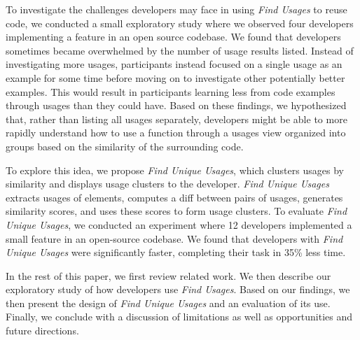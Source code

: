 \documentclass[conference]{IEEEtran}
\begin{document}


To investigate the challenges developers may face in using \textit{Find Usages} to reuse code, we conducted a small exploratory study where we observed four developers implementing a feature in an open source codebase. We found that developers sometimes became overwhelmed by the number of usage results listed. Instead of investigating more usages, participants instead focused on a single usage as an example for some time before moving on to investigate other potentially better examples. This would result in participants learning less from code examples through usages than they could have.
Based on these findings, we hypothesized that, rather than listing all usages separately, developers might be able to more rapidly understand how to use a function through a usages view organized into groups based on the similarity of the surrounding code. \par

To explore this idea, we propose \textit{Find Unique Usages}, which clusters usages by similarity and displays usage clusters to the developer. \textit{Find Unique Usages} extracts usages of elements, computes a diff between pairs of usages, generates similarity scores, and uses these scores to form usage clusters.
To evaluate \textit{Find Unique Usages}, we conducted  an experiment where 12 developers implemented a small feature in an open-source codebase. We found that developers with \textit{Find Unique Usages} were significantly faster, completing their task in 35\% less time.\par

In the rest of this paper, we first review related work. We then describe our exploratory study of how developers use \textit{Find Usages}. Based on our findings, we then present the design of \textit{Find Unique Usages} and an evaluation of its use. Finally, we conclude with a discussion of limitations as well as opportunities and future directions.
\end{document}
